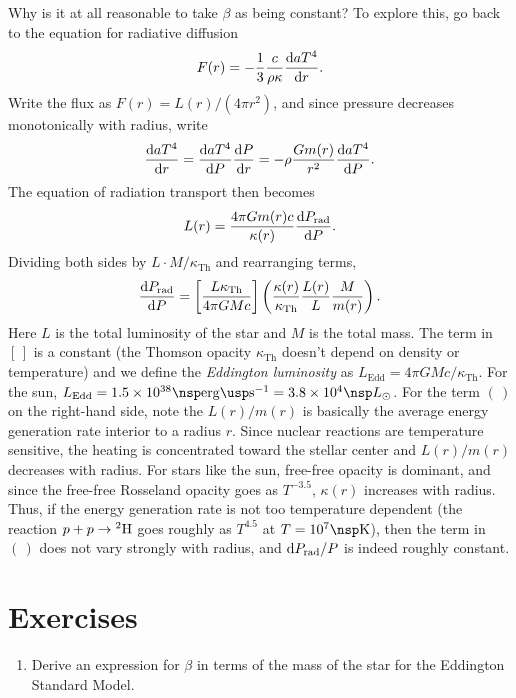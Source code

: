 Why is it at all reasonable to take $\beta$ as being constant? To explore this, go back to the equation for radiative diffusion
\[ F(r) = -\frac{1}{3}\frac{c}{\rho\kappa}\frac{\dif aT^{4}}{\dif r}. \]
Write the flux as $F(r) = L(r)/(4\pi r^{2})$, and since pressure decreases monotonically with radius, write
\[ 
\frac{\dif aT^{4}}{\dif r} = \frac{\dif aT^{4}}{\dif P}\frac{\dif P}{\dif r} = -\rho\frac{Gm(r)}{r^{2}}\frac{\dif aT^{4}}{\dif P}. 
\]
The equation of radiation transport then becomes
\[ L(r) = \frac{4\pi Gm(r) c}{\kappa(r)} \frac{\dif P_{\mathrm{rad}}}{\dif P}. \]
Dividing both sides by $L\cdot M/\kappa_{\mathrm{Th}}$ and rearranging terms,
\begin{equation}\label{e.Prad-P}
 \frac{\dif P_{\mathrm{rad}}}{\dif P} = \left[\frac{L\kappa_{\mathrm{Th}}}{4\pi GMc}\right]\left(\frac{\kappa(r)}{\kappa_{\mathrm{Th}}}\frac{L(r)}{L}\frac{M}{m(r)}\right).
\end{equation}
Here $L$ is the total luminosity of the star and $M$ is the total mass.  The term in $[\,]$ is a constant (the Thomson opacity $\kappa_{\mathrm{Th}}$ doesn't depend on density or temperature) and we define the \emph{Eddington luminosity} as $L_{\mathrm{Edd}}=4\pi GM c/\kappa_{\mathrm{Th}}$.  For the sun, $L_{\mathrm{Edd}} = 1.5\ee{38}\nsp\ergs\usp\second^{-1} = 3.8\ee{4}\nsp L_{\sun}$.  For the term $(\,)$ on the right-hand side, note the $L(r)/m(r)$ is basically the average energy generation rate interior to a radius $r$.  Since nuclear reactions are temperature sensitive, the heating is concentrated toward the stellar center and $L(r)/m(r)$ decreases with radius. For stars like the sun, free-free opacity is dominant, and since the free-free Rosseland opacity goes as $T^{-3.5}$, $\kappa(r)$ increases with radius.  Thus, if the energy generation rate is not too temperature dependent (the reaction $\pt + \pt \to \hydrogen[2]$ goes roughly as $T^{4.5}$ at $T=10^{7}\nsp\K$), then the term in $(\,)$  does not vary strongly with radius, and $\dif P_{\mathrm{rad}}/P$ is indeed roughly constant. 

\section{Exercises}
\begin{enumerate}
\item Derive an expression for $\beta$ in terms of the mass of the star for the Eddington Standard Model.
\end{enumerate}
